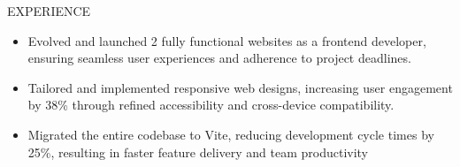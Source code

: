 \documentclass{resume} %
\begin{document}
\begin{rSection}{EXPERIENCE}
\begin{itemize}
\itemsep -3pt{}
\item Evolved and launched 2 fully functional websites as a frontend developer, ensuring seamless user experiences and adherence to project deadlines.
\item Tailored and implemented responsive web designs, increasing user engagement by 38\% through refined accessibility and cross-device compatibility.
\item Migrated the entire codebase to Vite, reducing development cycle times by 25\%, resulting in faster feature delivery and team productivity
\end{itemize}

\end{rSection}


\end{document}

